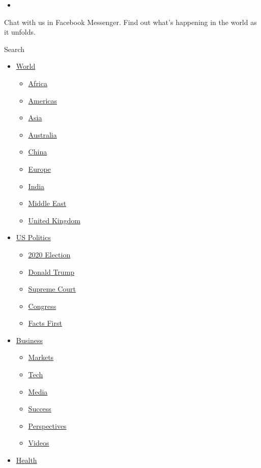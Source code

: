 \begin{itemize}
\item
\end{itemize}

Chat with us in Facebook Messenger. Find out what's happening in the
world as it unfolds.

Search

\begin{itemize}
\tightlist
\item
  \href{/world}{World}

  \begin{itemize}
  \tightlist
  \item
    \href{/africa}{Africa}
  \item
    \href{/americas}{Americas}
  \item
    \href{/asia}{Asia}
  \item
    \href{/australia}{Australia}
  \item
    \href{/china}{China}
  \item
    \href{/europe}{Europe}
  \item
    \href{/india}{India}
  \item
    \href{/middle-east}{Middle East}
  \item
    \href{/uk}{United Kingdom}
  \end{itemize}
\item
  \href{/politics}{US Politics}

  \begin{itemize}
  \tightlist
  \item
    \href{/election/2020}{2020 Election}
  \item
    \href{/specials/politics/president-donald-trump-45}{Donald Trump}
  \item
    \href{/specials/politics/supreme-court-nine}{Supreme Court}
  \item
    \href{/specials/politics/congress}{Congress}
  \item
    \href{/specials/politics/fact-check-politics}{Facts First}
  \end{itemize}
\item
  \href{/business}{Business}

  \begin{itemize}
  \tightlist
  \item
    \href{https://money.cnn.com/data/markets/}{Markets}
  \item
    \href{/business/tech}{Tech}
  \item
    \href{/business/media}{Media}
  \item
    \href{/business/success}{Success}
  \item
    \href{/business/perspectives}{Perspectives}
  \item
    \href{/business/videos}{Videos}
  \end{itemize}
\item
  \href{/health}{Health}


\end{itemize}
